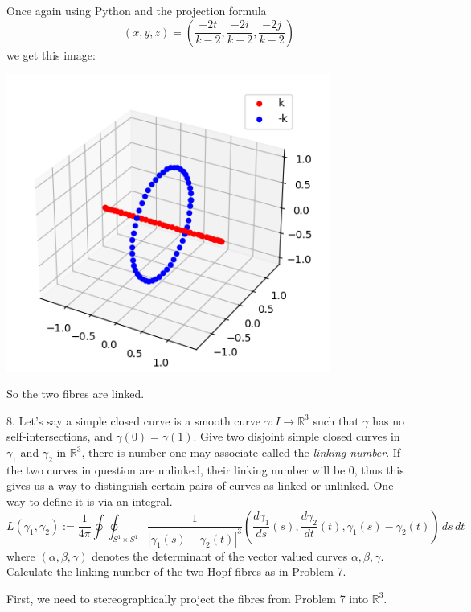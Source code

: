 \documentclass[12pt]{article}
\newcommand{\R}{\mathbb{R}}
\newcommand{\lra}{\longrightarrow}
\begin{document}
        Once again using Python and the projection formula 
        \[(x, y, z) = \left(\frac{-2t}{k-2}, \frac{-2i}{k-2}, \frac{-2j}{k-2}\right)\]
        we get this image:
        \begin{center}
            \includegraphics[width=0.8\textwidth]{Images/s3 projection.png}
        \end{center}

        So the two fibres are linked.
    \color{black}



\pagebreak 

8.  Let's say a simple closed curve is a smooth curve $\gamma: I \lra \R^{3}$ such that $\gamma$ has no self-intersections, and $\gamma(0) = \gamma(1)$.  Give two disjoint simple closed curves in $\gamma_{1}$ and $\gamma_{2}$ in $\R^{3}$, there is number one may associate called the \emph{linking number}.  If the two curves in question are unlinked, their linking number will be $0$, thus this gives us a way to distinguish certain pairs of curves as linked or unlinked.  One way to define it is via an integral.  
\[
L(\gamma_{1},\gamma_{2}) := \frac{1}{4\pi} \oint\oint_{S^{1}\times S^{1}} \frac{1}{|\gamma_{1}(s)-\gamma_{2}(t)|^{3}} \left(\frac{d\gamma_{1}}{ds}(s), \frac{d\gamma_{2}}{dt}(t), \gamma_{1}(s) - \gamma_{2}(t)\right) \, ds \, dt
\] 
where $\left( \alpha, \beta, \gamma \right)$ denotes the determinant of the vector valued curves $\alpha, \beta, \gamma$.  Calculate the linking number of the two Hopf-fibres as in Problem 7.  

    \color{blue}
        First, we need to stereographically project the fibres from Problem 7 into $\R^3$. 
       
\end{document}
